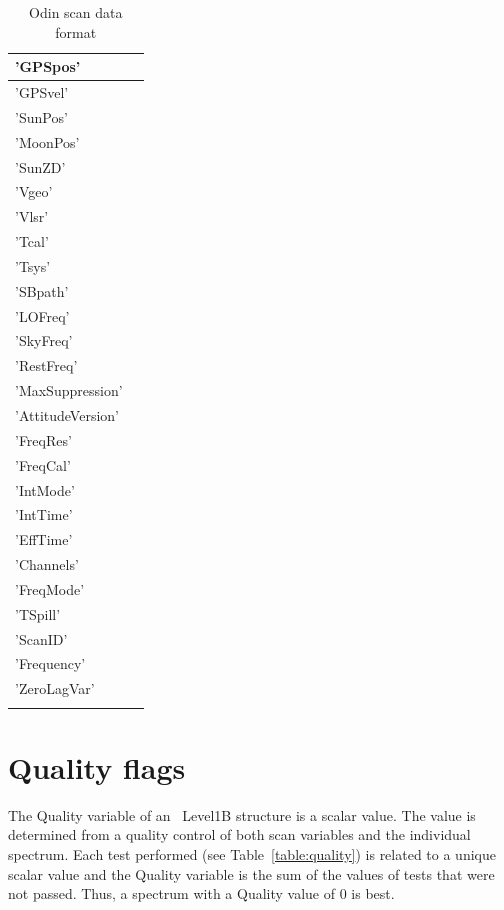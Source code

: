 \begin{longtable}{| p{} | p{} |}
     'GPSpos'          & \\ \hline
     'GPSvel'          & \\ \hline
     'SunPos'          & \\ \hline
     'MoonPos'         & \\ \hline
     'SunZD'           & \\ \hline
     'Vgeo'            & \\ \hline
     'Vlsr'            & \\ \hline
     'Tcal'            & \\ \hline
     'Tsys'            & \\ \hline
     'SBpath'          & \\ \hline
     'LOFreq'          & \\ \hline
     'SkyFreq'         & \\ \hline
     'RestFreq'        & \\ \hline
     'MaxSuppression'  & \\ \hline
     'AttitudeVersion' & \\  \hline
     'FreqRes'         & \\ \hline
     'FreqCal'         & \\ \hline
     'IntMode'         & \\ \hline
     'IntTime'         & \\ \hline
     'EffTime'         & \\ \hline
     'Channels'        & \\ \hline
     'FreqMode'        & \\ \hline
     'TSpill'          & \\ \hline
     'ScanID'          & \\ \hline
     'Frequency'       & \\ \hline
     'ZeroLagVar'      & \\ \hline
\hline
\caption{ Odin scan data format}
\label{table:dataformat}
\end{longtable}



\section{Quality flags}

The Quality variable of an \smr\ Level1B structure is a scalar value.
The value is determined from a quality control
of both scan variables and the individual spectrum.
Each test performed (see Table~\ref{table:quality}) is related to a unique scalar value
and the Quality variable is the sum of the values of tests 
that were not passed.  
Thus, a spectrum with a Quality value of 0 is best.

